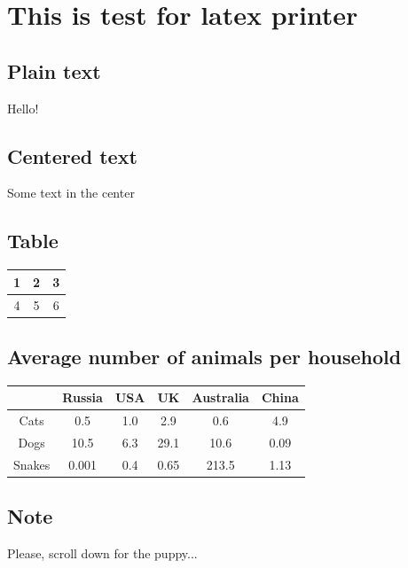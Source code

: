 \documentclass{article}
\begin{document}
\section{This is test for latex printer}
\subsection{Plain text}
Hello!
\subsection{Centered text}
\begin{center}
Some text in the center
\end{center}
\subsection{Table}
\begin{center}
\begin{tabular}
{| c | c | c |}
\hline
1 & 2 & 3\\
\hline
4 & 5 & 6\\
\hline
\end{tabular}
\end{center}
\subsection{Average number of animals per household}
\begin{tabular}
{| c || c  c  c  c  c |}
\hline
 & Russia & USA & UK & Australia & China\\
\hline\hline
Cats & 0.5 & 1.0 & 2.9 & 0.6 & 4.9\\
Dogs & 10.5 & 6.3 & 29.1 & 10.6 & 0.09\\
Snakes & 0.001 & 0.4 & 0.65 & 213.5 & 1.13\\
\hline
\end{tabular}
\subsection{Note}
\begin{center}
Please, scroll down for the puppy...
\end{center}
\end{document}
